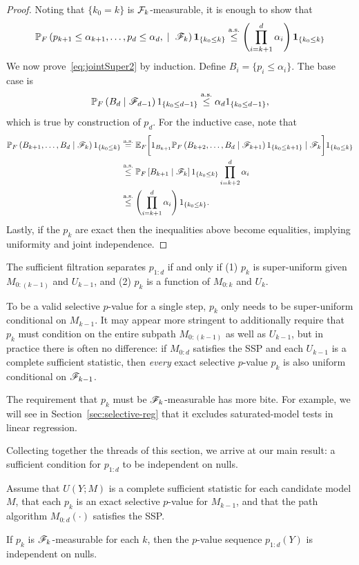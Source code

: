 \documentclass{article}
\begin{document}
\begin{proof}
  Noting that $\{k_0=k\}$ is $\mathcal{F}_k$-measurable, it is enough to show that 
  \begin{equation}\label{eq:jointSuper2}
  \mathbb{P}_F\left(p_{k+1}\leq \alpha_{k+1}, \ldots, p_d \leq \alpha_d, \;
    \mid\; \mathscr{F}_k\right)\mathbf{1}_{\{k_0\leq k\}} \overset{\textrm{a.s.}}{\leq} \left(\prod_{i=k+1}^d
  \alpha_i\right)\mathbf{1}_{\{k_0\leq k\}}
  \end{equation}
  We now prove~\eqref{eq:jointSuper2} by induction. Define $B_i = \{p_i \leq \alpha_i\}$. The base case is
  \[
  \mathbb{P}_F\left(B_d \mid \mathscr{F}_{d-1}\right)1_{\{k_0 \leq d-1\}} \overset{\textrm{a.s.}}{\leq} \alpha_d
1_{\{k_0 \leq d-1\}},
  \]
  which is true by construction of $p_d$. 
  For the inductive case, note that 
  \begin{align*}
    \mathbb{P}_F\left(B_{k+1}, \ldots, B_d
      \mid \mathscr{F}_k\right)1_{\{k_0 \leq k\}} 
    &\overset{\textrm{a.s.}}{=} \mathbb{E}_F\bigg[ 1_{B_{k+1}} 
    \mathbb{P}_F\left(B_{k+2}, \ldots, B_d
      \mid \mathscr{F}_{k+1}\right)1_{\{k_0 \leq k+1\}}
    \mid \mathscr{F}_k\bigg]1_{\{k_0 \leq k\}}\\
    &\overset{\textrm{a.s.}}{\leq} \mathbb{P}_F\left[ B_{k+1}
      \mid \mathscr{F}_k\right]1_{\{k_0 \leq k\}}\prod_{i=k+2}^d \alpha_i \\
    &\overset{\textrm{a.s.}}{\leq} \left(\prod_{i=k+1}^d \alpha_i \right)1_{\{k_0 \leq k\}} .
  \end{align*}
Lastly, if the $p_k$ are exact then the inequalities above become equalities, implying uniformity and joint independence.
\end{proof}

The sufficient filtration separates $p_{1:d}$ if and only if (1) $p_k$ is super-uniform given $M_{0:(k-1)}$ and $U_{k-1}$, and (2) $p_k$ is a function of $M_{0:k}$ and $U_k$.

To be a valid selective $p$-value for a single step, $p_k$ only needs to be super-uniform conditional on $M_{k-1}$. It may appear more stringent to additionally require that $p_k$ must condition on the entire subpath $M_{0:(k-1)}$ as well as $U_{k-1}$, but in practice there is often no difference: if $M_{0:d}$ satisfies the SSP and each $U_{k-1}$ is a complete sufficient statistic, then {\em every} exact selective $p$-value $p_k$ is also uniform conditional on $\mathscr{F}_{k-1}$.

The requirement that $p_k$ must be $\mathscr{F}_k$-measurable has more bite. For example, we will see in Section~\ref{sec:selective-reg} that it excludes saturated-model tests in linear regression.

Collecting together the threads of this section, we arrive at our main result: a sufficient condition for $p_{1:d}$ to be independent on nulls.
\begin{theorem} \label{thm:suffCond}
Assume that $U(Y; M)$ is a complete sufficient statistic for each candidate model $M$, that each $p_k$ is an exact selective $p$-value for $M_{k-1}$, and that the path algorithm $M_{0:d}(\cdot)$ satisfies the SSP.

If $p_k$ is $\mathscr{F}_k$-measurable for each $k$, then the $p$-value sequence $p_{1:d}(Y)$ is independent on nulls.
\end{theorem}
\end{document}
